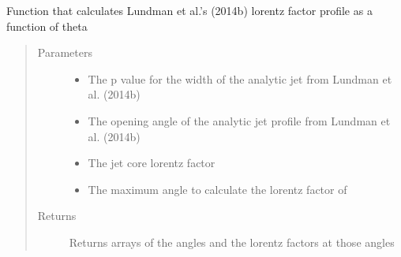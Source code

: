 \documentclass[letterpaper,10pt,english]{sphinxmanual}
\begin{document}
\begin{fulllineitems}
\label{\detokenize{read_process_files:read_process_files.lundmanPolarizationGamma}}
Function that calculates Lundman et al.’s (2014b) lorentz factor profile as a function of theta
\begin{quote}\begin{description}
\item[{Parameters}] \leavevmode\begin{itemize}
\item {} 
 \textendash{} The p value for the width of the analytic jet from Lundman et al. (2014b)

\item {} 
 \textendash{} The opening angle of the analytic jet profile from Lundman et al. (2014b)

\item {} 
 \textendash{} The jet core lorentz factor

\item {} 
 \textendash{} The maximum angle to calculate the lorentz factor of

\end{itemize}

\item[{Returns}] \leavevmode
Returns arrays of the angles and the lorentz factors at those angles

\end{description}\end{quote}

\end{fulllineitems}

\end{document}
